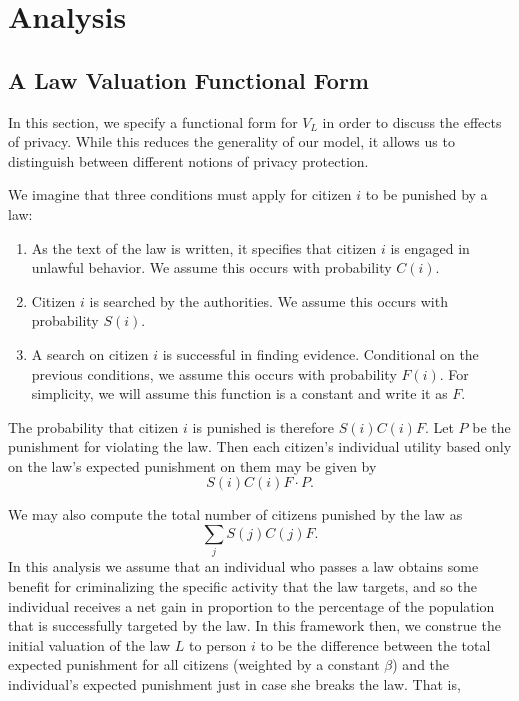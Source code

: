 
\section{Analysis}
\label{sec:analysis}



\subsection{A Law Valuation Functional Form}
In this section, we specify a functional form for $V_L$ in order to discuss the effects of privacy.  While this reduces the generality of our model, it allows us to distinguish between different notions of privacy protection.  

We imagine that three conditions must apply for citizen $i$ to be punished by a law:

\begin{enumerate}
\item As the text of the law is written, it specifies that citizen $i$ is engaged in unlawful behavior.  We assume this occurs with probability $C(i)$.
\item Citizen $i$ is searched by the authorities.  We assume this occurs with probability $S(i)$.
\item A search on citizen $i$ is successful in finding evidence.  Conditional on the previous conditions, we assume this occurs with probability $F(i)$.  For simplicity, we will assume this function is a constant and write it as $F$.
\end{enumerate}

The probability that citizen $i$ is punished is therefore $S(i)C(i)F$. 
Let $P$ be the punishment for violating the law. Then each citizen's individual utility based only on the law's expected punishment on them may be given by 
$$S(i)C(i)F\cdot P.$$

We may also compute the total number of citizens punished by the law as $$\sum_j S(j)C(j)F.$$  In this analysis we assume that an individual who passes a law obtains some benefit for criminalizing the specific activity that the law targets, and so the individual receives a net gain in proportion to the percentage of the population that is successfully targeted by the law.  In this framework then, we construe the initial valuation of the law $L$ to person $i$ to be the difference between the total expected punishment  for all citizens (weighted by a constant $\beta$) and the individual's expected punishment just in case she breaks the law. That is,  

